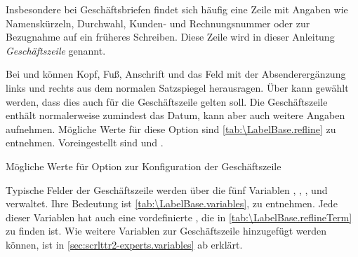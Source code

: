 \begin{Declaration}
\end{Declaration}
%
Insbesondere bei Geschäftsbriefen findet sich häufig eine Zeile mit Angaben
wie Namenskürzeln, Durchwahl,
Kunden- und Rechnungsnummer oder
zur Bezugnahme auf ein früheres Schreiben. Diese Zeile wird in dieser
Anleitung \emph{Geschäftszeile} genannt.

Bei  und  können Kopf, Fuß, Anschrift und
das Feld mit der Absenderergänzung links und rechts aus dem normalen
Satzspiegel herausragen.  Über
 kann
gewählt werden, dass dies auch für die Geschäftszeile gelten soll. Die
Geschäftszeile enthält normalerweise zumindest das Datum, kann aber auch
weitere Angaben aufnehmen. Mögliche Werte für diese Option sind
\autoref{tab:\LabelBase.refline} zu
entnehmen. Voreingestellt sind  und
.%
%
\begin{table}
  \caption[{Mögliche Werte für Option  bei
     und }]
  {Mögliche Werte für Option  zur
    Konfiguration der Geschäftszeile}
  \label{tab:\LabelBase.refline}
  \begin{desctabular}
  \end{desctabular}
\end{table}

\begin{Declaration}
\end{Declaration}
Typische Felder der Geschäftszeile werden über die fünf Variablen
, , , 
und  verwaltet. %
\iffalse %
Die Bedeutung dieser Felder %
\else %
Ihre Bedeutung %
\fi %
ist \autoref{tab:\LabelBase.variables}, 
zu entnehmen. Jede dieser Variablen hat auch eine vordefinierte
, die in \autoref{tab:\LabelBase.reflineTerm} zu finden
ist. Wie weitere Variablen zur Geschäftszeile hinzugefügt werden können, ist
in \autoref{sec:scrlttr2-experts.variables} ab
 erklärt.

